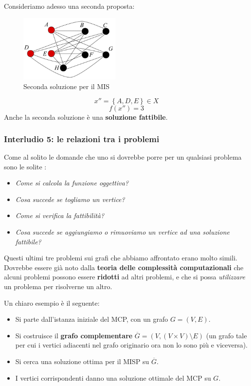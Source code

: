 \documentclass{article}
\begin{document}
Consideriamo adesso una seconda proposta:
\begin{figure}[H]
    \centering
    \includegraphics[width=5cm]{images/MIS_sol2.png}
    \caption{Seconda soluzione per il MIS}
    \label{fig:MIS_2}
\end{figure}

$$x''=\left\{A,D,E\right\}\in X$$
$$f(x'')=3$$
Anche la seconda soluzione è una \textbf{soluzione fattibile}.

\subsubsection{Interludio 5: le relazioni tra i problemi}
Come al solito le domande che uno si dovrebbe porre per un qualsiasi problema sono le solite :
\begin{itemize}
    \item \textit{Come si calcola la funzione oggettiva?}
    \item \textit{Cosa succede se togliamo un vertice?}
    \item \textit{Come si verifica la fattibilità?}
    \item \textit{Cosa succede se aggiungiamo o rimuoviamo un vertice ad una soluzione fattibile?}
\end{itemize}

Questi ultimi tre problemi sui grafi che abbiamo affrontato erano molto simili. Dovrebbe essere già noto
dalla \textbf{teoria delle complessità computazionali} che alcuni problemi possono essere \textbf{ridotti} ad altri
problemi, e che si possa \textit{utilizzare} un problema per risolverne un altro.

Un chiaro esempio è il seguente:
\begin{itemize}
    \item Si parte dall'istanza iniziale del MCP, con un grafo $G=(V,E)$.
    \item Si costruisce il \textbf{grafo complementare} $\overline{G}=(V,(V\times V)\setminus E)$ (un grafo tale
          per cui i vertici adiacenti nel grafo originario ora non lo sono più e viceversa).
    \item Si cerca una soluzione ottima per il MISP su $\overline{G}$.
    \item I vertici corrispondenti danno una soluzione ottimale del MCP su $G$.
\end{itemize}
\end{document}
